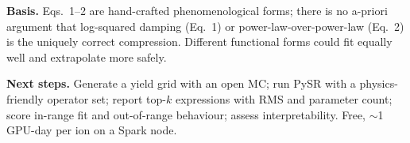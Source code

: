 \textbf{Basis.} Eqs.~1--2 are hand-crafted phenomenological forms; there is no a-priori argument that log-squared damping (Eq.~1) or power-law-over-power-law (Eq.~2) is the uniquely correct compression. Different functional forms could fit equally well and extrapolate more safely.

\textbf{Next steps.} Generate a yield grid with an open MC; run PySR with a physics-friendly operator set; report top-$k$ expressions with RMS and parameter count; score in-range fit and out-of-range behaviour; assess interpretability. Free, $\sim$1 GPU-day per ion on a Spark node.
